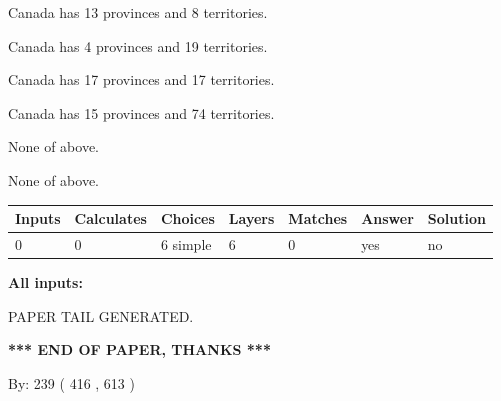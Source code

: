 \documentclass[12pt]{article}
\begin{document}
 
Canada has  13 provinces and  8 territories.
 
 
Canada has   4 provinces and  19 territories.
 
 
Canada has  17 provinces and  17 territories.
 
 
Canada has  15 provinces and  74 territories.
 
 
 None of above.
 
 
\noindent{}
 
 
 None of above.
 
 
\noindent{}
 
 
   
   
   
   
\noindent\begin{tabular}{|l|l|l|l|l|l|l|}
 \hline
Inputs & Calculates & Choices & Layers & Matches & Answer & Solution \\ \hline
 0  & 
 0  & 
 6
  simple  
  & 
 6  & 
 0  & 
  yes & 
  no 
  \\ \hline
 \end{tabular}
   
   
   
   
\noindent{}
   
   
   
   
\noindent\vspace{0.1in}\hspace{-0.08in} {\textbf{\Large{All inputs: }}}
   
   
   
   
   
   
 \vspace{0.2in}
 
   
   
\vspace{2.0in} PAPER TAIL GENERATED.
   
   
   
   
\vspace{1.0in} 
{\textbf{\large{ *** END OF PAPER, THANKS *** }}} 
   
   
\hspace{1.0in} By: 
 239 ( 416 ,  613 )
   
\end{document}
